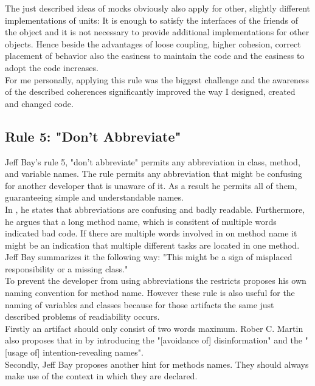 The just described ideas of mocks obviously also apply for other, slightly different implementations of units: It is enough to satisfy the interfaces of the friends of the object and it is not necessary to provide additional implementations for other objects. Hence beside the advantages of loose coupling, higher cohesion, correct placement of behavior also the easiness to maintain the code and the easiness to adopt the code increases. 
\\

For me personally, applying this rule was the biggest challenge and the awareness of the described coherences significantly improved the way I designed, created and changed code. 

\subsection*{Rule 5: "Don't Abbreviate"}
Jeff Bay's rule 5, "don't abbreviate" permits any abbreviation in class, method, and variable names. The rule permits any abbreviation that might be confusing for another developer that is unaware of it. As a result he permits all of them, guaranteeing simple and understandable names.
\\

In \cite{oc2008}, he states that abbreviations are confusing and badly readable. Furthermore, he argues that a long method name, which is consitent of multiple words indicated bad code. If there are multiple words involved in on method name it might be an indication that multiple different tasks are located in one method.  Jeff Bay summarizes it the following way: "This might be a sign of misplaced responsibility or a missing class." \cite{oc2008}
\\

To prevent the developer from using abbreviations the restricts proposes his own naming convention for method name. However these rule is also useful for the naming of variables and classes because for those artifacts the same just described problems of readiability occurs.\\

Firstly an artifact should only consist of two words maximum. Rober C. Martin also proposes that in \cite[p. 19]{cc} by introducing the "[avoidance of] disinformation" and the "[usage of] intention-revealing names". 
\\

Secondly, Jeff Bay proposes another hint for methods names. They should always make use of the context in which they are declared. 
\\

